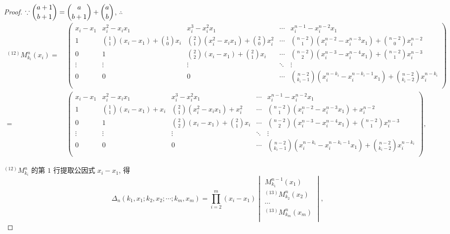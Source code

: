 \documentclass[color=black,device=normal,lang=cn,mode=geye]{elegantnote}
\begin{document}
\begin{landscape}
\begin{proof}
    $\because\dbinom{a+1}{b+1}=\dbinom{a}{b+1}+\dbinom{a}{b}$, $\therefore$
    \begin{align*}
        ^{(12)}M_{k_i}^n(x_i)= & \ \begin{pmatrix}
            x_i-x_1 & x_i^2-x_ix_1 & x_i^3-x_i^2x_1 & \cdots & x_i^{n-1}-x_i^{n-2}x_1 \\[4pt]
            1 & \binom{1}{1}(x_i-x_1)+\binom{1}{0}x_i & \binom{2}{1}(x_i^2-x_ix_1)+\binom{2}{0}x_i^2 & \cdots & \binom{n-2}{1}(x_i^{n-2}-x_i^{n-3}x_1)+\binom{n-2}{0}x_i^{n-2} \\[10pt]
            0 & 1 & \binom{2}{2}(x_i-x_1)+\binom{2}{1}x_i & \cdots & \binom{n-2}{2}(x_i^{n-3}-x_i^{n-4}x_1)+\binom{n-2}{1}x_i^{n-3} \\
            \vdots & \vdots & \vdots & \ddots & \vdots \\[4pt]
            0 & 0 & 0 & \cdots & \binom{n-2}{k_i-1}(x_i^{n-k_i}-x_i^{n-k_i-1}x_1)+\binom{n-2}{k_i-2}x_i^{n-k_i} \\
        \end{pmatrix} \\
        = & \ \begin{pmatrix}
            x_i-x_1 & x_i^2-x_ix_1 & x_i^3-x_i^2x_1 & \cdots & x_i^{n-1}-x_i^{n-2}x_1 \\[4pt]
            1 & \binom{1}{1}(x_i-x_1)+x_i & \binom{2}{1}(x_i^2-x_ix_1)+x_i^2 & \cdots & \binom{n-2}{1}(x_i^{n-2}-x_i^{n-3}x_1)+x_i^{n-2} \\[10pt]
            0 & 1 & \binom{2}{2}(x_i-x_1)+\binom{2}{1}x_i & \cdots & \binom{n-2}{2}(x_i^{n-3}-x_i^{n-4}x_1)+\binom{n-2}{1}x_i^{n-3} \\
            \vdots & \vdots & \vdots & \ddots & \vdots \\[4pt]
            0 & 0 & 0 & \cdots & \binom{n-2}{k_i-1}(x_i^{n-k_i}-x_i^{n-k_i-1}x_1)+\binom{n-2}{k_i-2}x_i^{n-k_i} \\
        \end{pmatrix},
    \end{align*}

    $^{(12)}M_{k_i}^n$ 的第 $1$ 行提取公因式 $x_i-x_1$, 得
    \[\Delta_n(k_1,x_1;k_2,x_2;\cdots;k_m,x_m)=\prod\limits_{i=2}^m(x_i-x_1)\begin{vmatrix}
        M_{k_1}^{n-1}(x_1) \\
        ^{(13)}M_{k_2}^n(x_2) \\
        \cdots \\
        ^{(13)}M_{k_m}^n(x_m) \\
    \end{vmatrix},\]


\end{proof}
\end{landscape}
\end{document}
